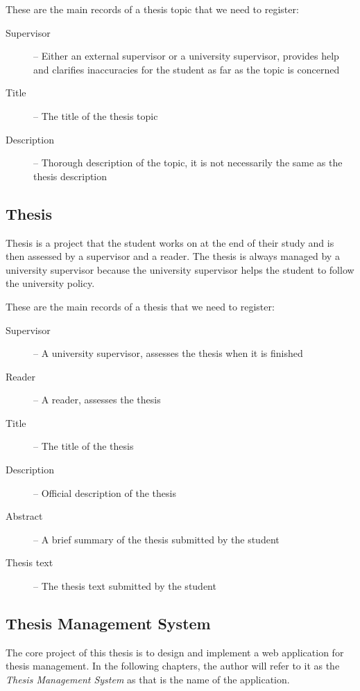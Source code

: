 These are the main records of a thesis topic that we need to register:
\begin{description}
  \item[Supervisor] -- Either an external supervisor or a university supervisor, provides help and clarifies inaccuracies for the student as far as the topic is concerned
  \item[Title] -- The title of the thesis topic
  \item[Description] -- Thorough description of the topic, it is not necessarily the same as the thesis description
\end{description}

\subsection{Thesis}

Thesis is a project that the student works on at the end of their study and is then assessed by a supervisor and a reader.
The thesis is always managed by a university supervisor because the university supervisor helps the student to follow the university policy.

These are the main records of a thesis that we need to register:
\begin{description}
  \item[Supervisor] -- A university supervisor, assesses the thesis when it is finished
  \item[Reader] -- A reader, assesses the thesis
  \item[Title] -- The title of the thesis
  \item[Description] -- Official description of the thesis
  \item[Abstract] -- A brief summary of the thesis submitted by the student
  \item[Thesis text] -- The thesis text submitted by the student
\end{description}

\subsection{Thesis Management System}

The core project of this thesis is to design and implement a web application for thesis management. In the following chapters, the author will refer to it as the \emph{Thesis Management System} as that is the name of the application.